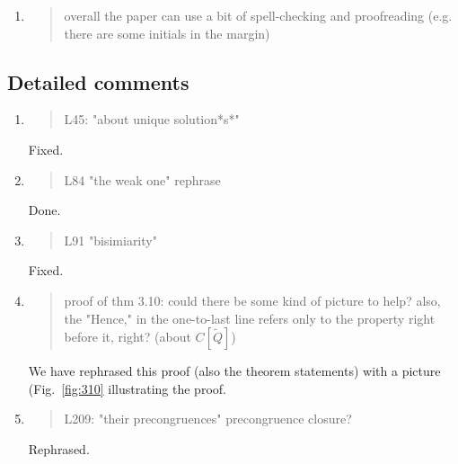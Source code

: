\begin{enumerate}
\item \begin{quote}
    overall the paper can use a bit of spell-checking and proofreading (e.g. there are some initials in the margin)
  \end{quote}


\end{enumerate}

\subsection*{Detailed comments}

\begin{enumerate}
\item \begin{quote}
    L45: "about unique solution*s*"
  \end{quote}
  Fixed.
  
\item \begin{quote}
    L84 "the weak one" rephrase
  \end{quote}


Done. 

  
\item \begin{quote}
    L91 "bisimiarity"
  \end{quote}

Fixed.
  
\item \begin{quote}
    proof of thm 3.10: could there be some kind of picture to help? also, the "Hence," in the one-to-last line refers only to the property right before it, right? (about $C[\tilde{Q}]$)
  \end{quote}

  We have rephrased this proof (also the theorem statements) with a
  picture (Fig.~\ref{fig:310} illustrating the proof. 
  
\item \begin{quote}
    L209: "their precongruences" precongruence closure?
  \end{quote}

  Rephrased.



\end{enumerate}
